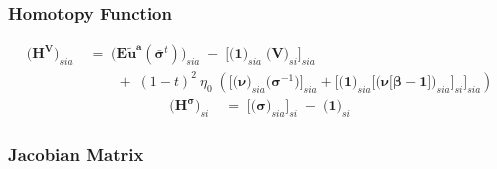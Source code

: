\documentclass[11pt,fleqn]{article}
\newcommand{\bsigma}{\bm{\sigma}}
\newcommand{\bbeta}{\bm{\beta}}
\newcommand{\bV}{\bm{V}}
\newcommand{\bnu}{\bm{\nu}}
\newcommand{\bone}{\bm{1}}
\newcommand{\tu}{\tilde{u}}
\begin{document}
\subsubsection*{Homotopy Function}

\begin{align*}
	\biggl( \bm{H^{V}} \biggr)_{sia} & \;=\; 
		\biggl( \bm{{E\tu^{a}}}(\bar{\bsigma}^t) \biggr)_{sia} \;-\; \Biggl[ \biggl( \bone \biggr)_{sia} \; \biggl( \bV \biggr)_{si} \Biggr]_{sia} \\
		& \qquad \;+\; (1-t)^2 \: \eta_0 \; \left( \Biggl[ \biggl( \bnu \biggr)_{sia} \biggl( \bsigma^{-1} \biggr) \Biggr]_{sia} + \Biggl[ \biggl( \bone \biggr)_{sia} \Biggl[ \biggl( \bnu\bigl[\bbeta-\bone\bigr] \biggr)_{sia} \Biggr]_{si} \Biggr]_{sia} \right)
\end{align*}
\begin{align*}
	\biggl( \bm{H^{\sigma}} \biggr)_{si} & \;=\; 
		\Biggl[ \biggl( \bsigma \biggr)_{sia} \Biggr]_{si} \;-\; \biggl( \bone \biggr)_{si} 
\end{align*}


\subsubsection*{Jacobian Matrix} 
\end{document}
